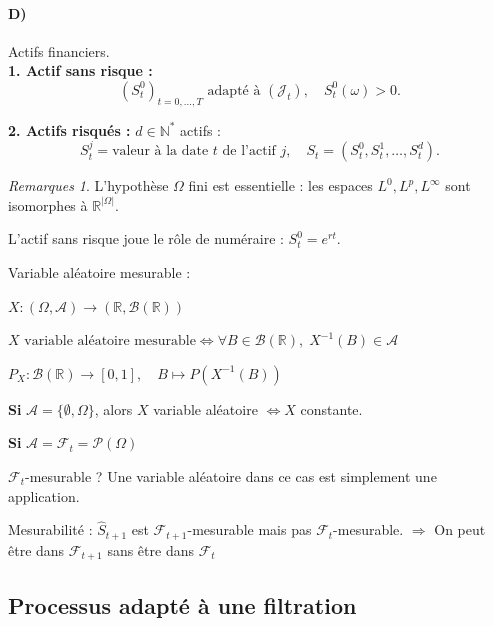 \documentclass[12pt,a4paper]{article}
\numberwithin{equation}{section}
\theoremstyle{plain} %
\theoremstyle{definition} %
\theoremstyle{remark} %
\newtheorem*{remarques}{Remarques}
\theoremstyle{myexample}
\theoremstyle{definition}
\newcommand{\RR}{\mathbb{R}}
\begin{document}
\paragraph{D)} Actifs financiers.\\

\textbf{1. Actif sans risque :}
\[
(S_t^0)_{t=0,\ldots,T} \text{ adapté à } (\mathcal{J}_t), \quad S_t^0(\omega)>0.
\]

\textbf{2. Actifs risqués :} $d\in\mathbb{N}^*$ actifs :
\[
S_t^j = \text{valeur à la date } t \text{ de l’actif } j, \quad S_t = (S_t^0, S_t^1, \ldots, S_t^d).
\]

\begin{remarques}
\item L’hypothèse $\Omega$ fini est essentielle : les espaces $L^0,L^p,L^\infty$ sont isomorphes à $\RR^{|\Omega|}$.
\item L’actif sans risque joue le rôle de numéraire : $S_t^0 = e^{rt}$.
\item Variable aléatoire mesurable :

$X : (\Omega, \mathcal{A}) \longrightarrow (\mathbb{R}, \mathcal{B}(\mathbb{R}))$

$X \text{ variable aléatoire mesurable} \Longleftrightarrow \forall B \in \mathcal{B}(\mathbb{R}), \; X^{-1}(B) \in \mathcal{A}$

$P_X : \mathcal{B}(\mathbb{R}) \longrightarrow [0,1], \quad B \longmapsto P(X^{-1}(B))$

\vspace{1em}
\textbf{Si } $\mathcal{A} = \{\emptyset, \Omega\}$, 
alors $X$ variable aléatoire $\Longleftrightarrow X$ constante.

\vspace{1em}

\textbf{Si } $\mathcal{A} = \mathcal{F}_t = \mathcal{P}(\Omega)$

 $\mathcal{F}_t$-mesurable ? Une variable aléatoire dans ce cas est simplement une application.

\vspace{1em}
\item Mesurabilité :
$\hat{S}_{t+1}$ est $\mathcal{F}_{t+1}$-mesurable mais pas $\mathcal{F}_t$-mesurable. $\Rightarrow$ On peut être dans $\mathcal{F}_{t+1}$ sans être dans $\mathcal{F}_t$

\end{remarques}

\subsection{Processus adapté à une filtration}
\end{document}
